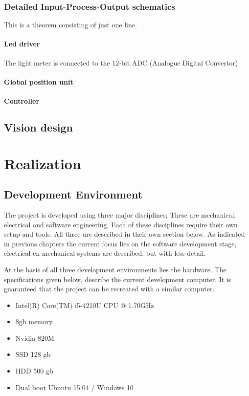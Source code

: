 \documentclass[11pt,fleqn,,a4paper,twoside,openright]{book}
\begin{document}
\section{Detailed Input-Process-Output schematics} 
This is a theorem consisting of just one line.

\subsection{Led driver}
The light meter is connected to the 12-bit ADC (Analogue Digital Convertor)

\subsection{Global position unit}

\subsection{Controller}

\chapter{Vision design}

\part{Realization}

\chapter{Development Environment}
The project is developed using three major disciplines; These are mechanical, electrical and software engineering. Each of these disciplines require their own setup and tools. All three are described in their own section below. As indicated in previous chapters  the current focus lies on the software development stage, electrical en mechanical systems are described, but with less detail.

At the basis of all three development environments lies the hardware. The specifications given below, describe the current development computer. It is guaranteed that the project can be recreated with a similar computer. 
\begin{itemize}
	\item Intel(R) Core(TM) i5-4210U CPU @ 1.70GHz
	\item 8gb memory
	\item Nvidia 820M
	\item SSD 128 gb
	\item HDD 500 gb
	\item Dual boot Ubuntu 15.04 / Windows 10	
\end{itemize}
\end{document}
